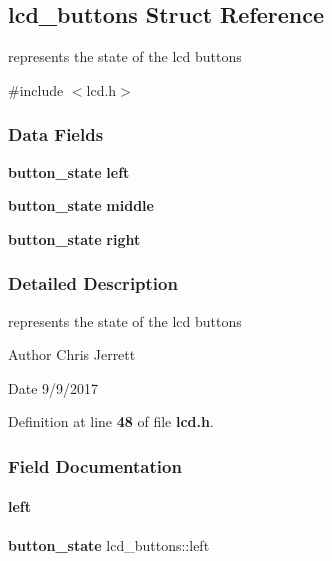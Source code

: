 \subsection{lcd\+\_\+buttons Struct Reference}
\label{structlcd__buttons}


represents the state of the lcd buttons  




{\ttfamily \#include $<$lcd.\+h$>$}

\subsubsection*{Data Fields}
\begin{DoxyCompactItemize}
\item 
\textbf{ button\+\_\+state} \textbf{ left}
\item 
\textbf{ button\+\_\+state} \textbf{ middle}
\item 
\textbf{ button\+\_\+state} \textbf{ right}
\end{DoxyCompactItemize}


\subsubsection{Detailed Description}
represents the state of the lcd buttons 

\begin{DoxyAuthor}{Author}
Chris Jerrett 
\end{DoxyAuthor}
\begin{DoxyDate}{Date}
9/9/2017 
\end{DoxyDate}


Definition at line \textbf{ 48} of file \textbf{ lcd.\+h}.



\subsubsection{Field Documentation}
\mbox{\label{structlcd__buttons_ae385efb5ec794acf5f11027f46c6c039}} 
\paragraph{left}
{\footnotesize\ttfamily \textbf{ button\+\_\+state} lcd\+\_\+buttons\+::left}



